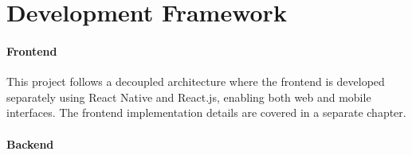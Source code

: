 \section{Development Framework}

\paragraph{Frontend}  
This project follows a decoupled architecture where the frontend is developed separately using React Native and React.js, enabling both web and mobile interfaces. The frontend implementation details are covered in a separate chapter.

\paragraph{Backend}  
 
